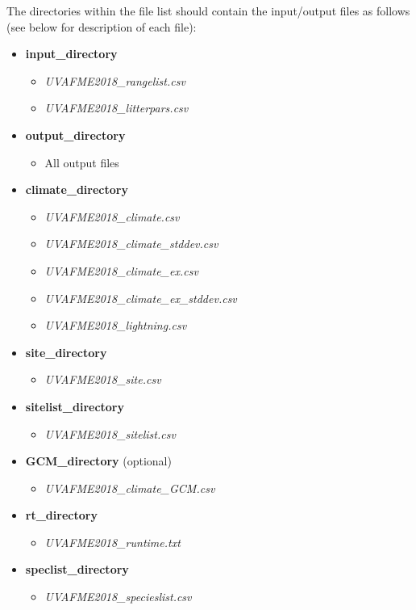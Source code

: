 \documentclass[a4paper, 12pt] {article}
\begin{document}
The directories within the file list should contain the input/output files as follows (see below for description of each file):
\begin{itemize}
\item \textbf{input\_directory}
	\begin{itemize}
	\item \textit{UVAFME2018\_rangelist.csv}
	\item \textit{UVAFME2018\_litterpars.csv}
	\end{itemize}
\item \textbf{output\_directory}
	\begin{itemize}
	\item All output files
	\end{itemize}
\item \textbf{climate\_directory}
	\begin{itemize}
	\item \textit{UVAFME2018\_climate.csv}
	\item \textit{UVAFME2018\_climate\_stddev.csv}
	\item \textit{UVAFME2018\_climate\_ex.csv}
	\item \textit{UVAFME2018\_climate\_ex\_stddev.csv}
	\item \textit{UVAFME2018\_lightning.csv}
	\end{itemize}
\item \textbf{site\_directory}
	\begin{itemize}
	\item \textit{UVAFME2018\_site.csv}
	\end{itemize}
\item \textbf{sitelist\_directory}
	\begin{itemize}
	\item \textit{UVAFME2018\_sitelist.csv}
	\end{itemize}
\item \textbf{GCM\_directory} (optional)
	\begin{itemize}
	\item \textit{UVAFME2018\_climate\_GCM.csv}
	\end{itemize}
\item \textbf{rt\_directory} 
	\begin{itemize}
	\item \textit{UVAFME2018\_runtime.txt}
	\end{itemize}
\item \textbf{speclist\_directory}
	\begin{itemize}
	\item \textit{UVAFME2018\_specieslist.csv}
	\end{itemize}
\end{itemize}
\end{document}
